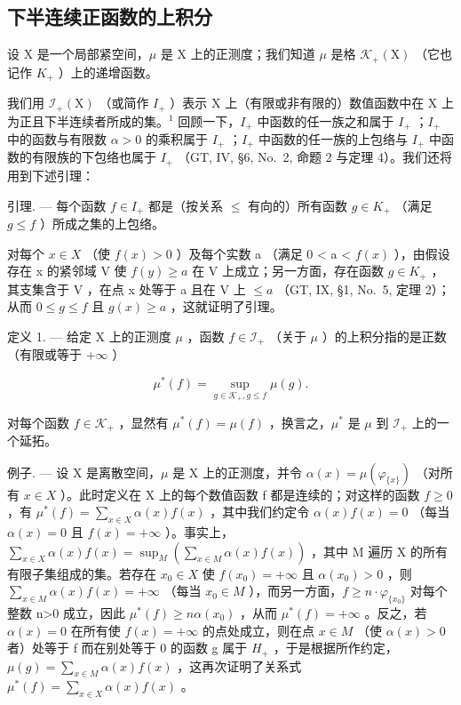 \subsection{下半连续正函数的上积分}

设 X 是一个局部紧空间，\(\mu\) 是 X 上的正测度；我们知道 \(\mu\) 是格 \(\mathcal{K}_{+}(\mathrm{X})\) （它也记作 \(K_{+}\) ）上的递增函数。

我们用 \(\mathcal{I}_{+}(\mathrm{X})\) （或简作 \(I_{+}\) ）表示 X 上（有限或非有限的）数值函数中在 X 上为正且下半连续者所成的集。\(^{1}\) 回顾一下，\(I_{+}\) 中函数的任一族之和属于 \(I_{+}\) ；\(I_{+}\) 中的函数与有限数 \(\alpha > 0\) 的乘积属于 \(I_{+}\) ；\(I_{+}\) 中函数的任一族的上包络与 \(I_{+}\) 中函数的有限族的下包络也属于 \(I_{+}\) （GT, IV, §6, No.~2, 命题 2 与定理 4）。我们还将用到下述引理：

引理. --- 每个函数 \(f \in I_{+}\) 都是（按关系 \(\leqslant\) 有向的）所有函数 \(g \in K_{+}\) （满足 \(g \leqslant f\) ）所成之集的上包络。

对每个 \(x \in X\) （使 \(f(x) > 0\) ）及每个实数 a （满足 0 < a < \(f(x)\) ），由假设存在 x 的紧邻域 V 使 \(f(y) \geqslant a\) 在 V 上成立；另一方面，存在函数 \(g \in K_{+}\) ，其支集含于 V ，在点 x 处等于 a 且在 V 上 \(\leqslant a\) （GT, IX, §1, No.~5, 定理 2）；从而 \(0 \leqslant g \leqslant f\) 且 \(g(x) \geqslant a\) ，这就证明了引理。

定义 1. --- 给定 X 上的正测度 \(\mu\) ，函数 \(f \in \mathcal{I}_{+}\) （关于 \(\mu\) ）的上积分指的是正数（有限或等于 \(+\infty\) ）

\[
\mu^ {*} (f) = \sup _ {g \in \mathcal {K} _ {+}, g \leqslant f} \mu (g).
\]

对每个函数 \(f \in \mathcal{K}_+\) ，显然有 \(\mu^*(f) = \mu(f)\) ，换言之，\(\mu^*\) 是 \(\mu\) 到 \(\mathcal{I}_+\) 上的一个延拓。

例子. --- 设 X 是离散空间，\(\mu\) 是 X 上的正测度，并令 \(\alpha(x)=\mu(\varphi_{\{x\}})\) （对所有 \(x\in X\) ）。此时定义在 X 上的每个数值函数 f 都是连续的；对这样的函数 \(f\geqslant0\) ，有 \(\mu^{*}(f)=\sum_{x\in X}\alpha(x)f(x)\) ，其中我们约定令 \(\alpha(x)f(x)=0\) （每当 \(\alpha(x)=0\) 且 \(f(x)=+\infty\) ）。事实上，\(\sum_{x\in X}\alpha(x)f(x)=\sup_{M}\left(\sum_{x\in M}\alpha(x)f(x)\right)\) ，其中 M 遍历 X 的所有有限子集组成的集。若存在 \(x_{0}\in X\) 使 \(f(x_{0})=+\infty\) 且 \(\alpha(x_{0})>0\) ，则 \(\sum_{x\in M}\alpha(x)f(x)=+\infty\) （每当 \(x_{0}\in M\) ），而另一方面，\(f\geqslant n\cdot\varphi_{\{x_{0}\}}\) 对每个整数 n\textgreater0 成立，因此 \(\mu^{*}(f)\geqslant n\alpha(x_{0})\) ，从而 \(\mu^{*}(f)=+\infty\) 。反之，若 \(\alpha(x)=0\) 在所有使 \(f(x)=+\infty\) 的点处成立，则在点 \(x\in M\) （使 \(\alpha(x)>0\) 者）处等于 f 而在别处等于 0 的函数 g 属于 \(H_{+}\) ，于是根据所作约定，\(\mu(g)=\sum_{x\in M}\alpha(x)f(x)\) ，这再次证明了关系式 \(\mu^{*}(f)=\sum_{x\in X}\alpha(x)f(x)\) 。

